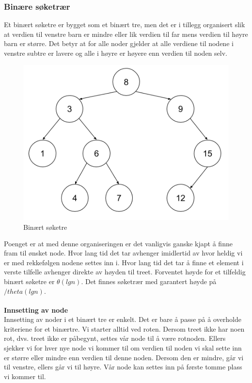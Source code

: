 \subsubsection{Binære søketrær}
Et binært søketre er bygget som et binært tre, men det er i tillegg organisert slik at verdien til venstre barn er mindre eller lik verdien til far mens verdien til høyre barn er større. Det betyr at for alle noder gjelder at alle verdiene til nodene i venstre subtre er lavere og alle i høyre er høyere enn verdien til noden selv. 

\begin{figure}[H]
\includegraphics[scale=0.6]{images/binaeresoeketraer}
\centering %
\caption{Binært søketre}
\label{fig:binaeresoeketraer}
\end{figure}

\noindent Poenget er at med denne organiseringen er det vanligvis ganske kjapt å finne fram til ønsket node. Hvor lang tid det tar avhenger imidlertid av hvor heldig vi er med rekkefølgen nodene settes inn i. Hvor lang tid det tar å finne et element i verste tilfelle avhenger direkte av høyden til treet.  Forventet høyde for et tilfeldig binært søketre er $\theta(lg n)$. Det finnes søketrær med garantert høyde på $/theta(lg n)$.
\\\\
\textbf{Innsetting av node}\\
Innsetting av noder i et binært tre er enkelt. Det er bare å passe på å overholde kriteriene for et binærtre. Vi starter alltid ved roten. Dersom treet ikke har noen rot, dvs. treet ikke er påbegynt, settes vår node til å være rotnoden. Ellers sjekker vi for hver nye node vi kommer til om verdien til noden vi skal sette inn er større eller mindre enn verdien til denne noden. Dersom den er mindre, går vi til venstre, ellers går vi til høyre. Vår node kan settes inn på første tomme plass vi kommer til.


